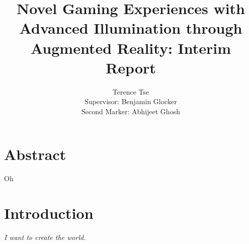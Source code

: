 \documentclass[11pt]{report}
\begin{document}
\title{Novel Gaming Experiences with Advanced Illumination 
through Augmented Reality: Interim Report}
\author{Terence Tse \\
		Supervisor: Benjamin Glocker\\
		Second Marker: Abhijeet Ghosh}
\maketitle
\newpage
\tableofcontents
\newpage

\section*{Abstract}
Oh
\newpage

\section*{Introduction}
\begin{center}
\textit{I want to create the world.}
\end{center}
\end{document}
